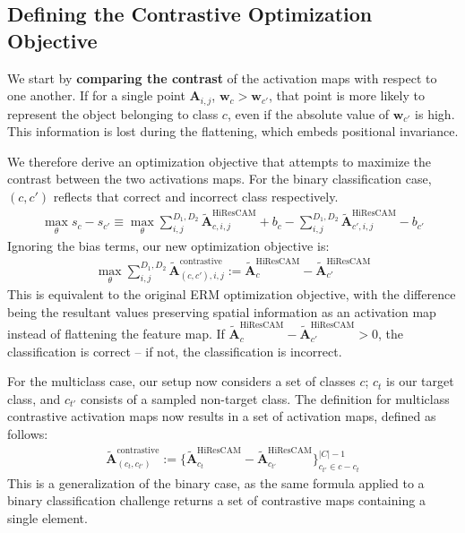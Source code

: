 \documentclass{article}
\begin{document}
\subsection{Defining the Contrastive Optimization Objective}

We start by \textbf{comparing the contrast} of the activation maps with respect to one another. If for a single point $\bm{A}_{i,j}$, $\bm{w}_c > \bm{w}_{c'}$, that point is more likely to represent the object belonging to class $c$, even if the absolute value of $\bm{w}_{c'}$ is high. This information is lost during the flattening, which embeds positional invariance.

We therefore derive an optimization objective that attempts to maximize the contrast between the two activations maps. For the binary classification case, $(c, c')$ reflects that correct and incorrect class respectively.
\begin{gather}
	\max_{\theta} s_c - s_{c'} \equiv \max_{\theta} \sum^{D_1,D_2}_{i,j} \tilde{\mathcal{\bm{A}}}_{c,i,j}^{\text{HiResCAM}} + b_c - \sum^{D_1,D_2}_{i,j} \tilde{\mathcal{\bm{A}}}_{c',i,j}^{\text{HiResCAM}} - b_{c'}
\end{gather}
Ignoring the bias terms, our new optimization objective is:
\begin{gather}
	\max_{\theta} \sum^{D_1,D_2}_{i,j} \tilde{\mathcal{\bm{A}}}^{\text{contrastive}}_{(c, c'), i, j} := \tilde{\mathcal{\bm{A}}}_{c}^{\text{HiResCAM}} - \tilde{\mathcal{\bm{A}}}_{c'}^{\text{HiResCAM}}
\end{gather}
This is equivalent to the original ERM optimization objective, with the difference being the resultant values preserving spatial information as an activation map instead of flattening the feature map. If $\tilde{\mathcal{\bm{A}}}_{c}^{\text{HiResCAM}} - \tilde{\mathcal{\bm{A}}}_{c'}^{\text{HiResCAM}} > 0$, the classification is correct -- if not, the classification is incorrect. 

For the multiclass case, our setup now considers a set of classes $c$; $c_t$ is our target class, and $c_{t'}$ consists of a sampled non-target class. The definition for multiclass contrastive activation maps now results in a set of activation maps, defined as follows:
\begin{gather}
	\tilde{\mathcal{\bm{A}}}^{\text{contrastive}}_{(c_t, c_{t'})} := \{\tilde{\mathcal{\bm{A}}}_{c_t}^{\text{HiResCAM}} - \tilde{\mathcal{\bm{A}}}_{c_{t'}}^{\text{HiResCAM}}\}^{|C|-1}_{c_{t'} \in c - c_t}
\end{gather}
This is a generalization of the binary case, as the same formula applied to a binary classification challenge returns a set of contrastive maps containing a single element.
\end{document}
